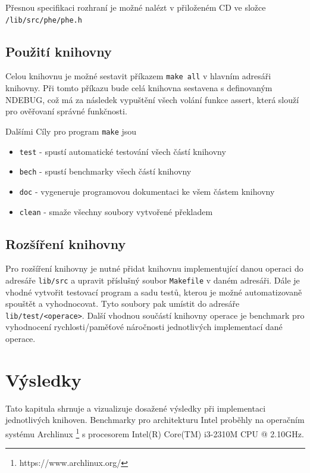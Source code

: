 Přesnou specifikaci rozhraní je možné nalézt v přiloženém CD ve složce \texttt{/lib/src/phe/phe.h}


\section{Použití knihovny} %
Celou knihovnu je možné sestavit příkazem \texttt{make all} v hlavním adresáři knihovny.
Při tomto příkazu bude celá knihovna sestavena s definovaným NDEBUG, což má za následek vypuštění všech
volání funkce assert, která slouží pro ověřovaní správné funkčnosti.

Dalšími Cíly pro program \texttt{make} jsou

\begin{itemize}
	\item{\texttt{test} - spustí automatické testování všech částí knihovny}
	\item{\texttt{bech} - spustí benchmarky všech částí knihovny}
	\item{\texttt{doc} - vygeneruje programovou dokumentaci ke všem částem knihovny}
	\item{\texttt{clean} - smaže všechny soubory vytvořené překladem}
\end{itemize}

\section{Rozšíření knihovny} %

Pro rozšíření knihovny je nutné přidat knihovnu implementující danou operaci
do adresáře \texttt{lib/src} a upravit příslušný soubor \texttt{Makefile} v daném adresáři.
Dále je vhodné vytvořit testovací program a sadu testů, kterou je možné automatizovaně spouštět a vyhodnocovat.
Tyto soubory pak umístit do adresáře \texttt{lib/test/<operace>}.
Další vhodnou součástí knihovny operace je benchmark pro vyhodnocení rychlosti/paměťové náročnosti jednotlivých
implementací dané operace.



\chapter{Výsledky}\label{chapter:results} %
Tato kapitula shrnuje a vizualizuje dosažené výsledky při implementaci jednotlivých knihoven.
Benchmarky pro architekturu Intel proběhly na operačním systému Archlinux \footnote{https://www.archlinux.org/} s procesorem Intel(R) Core(TM) i3-2310M CPU @ 2.10GHz.

